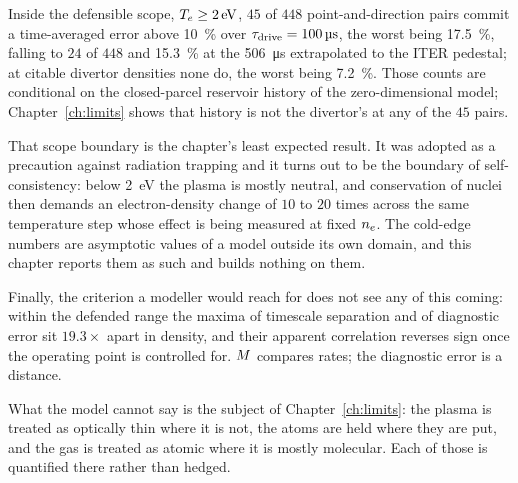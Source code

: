 Inside the defensible scope, $T_e\ge\SI{2}{\electronvolt}$, $45$ of $448$
point-and-direction pairs commit a time-averaged error above \SI{10}{\percent}
over $\tau_{\mathrm{drive}} = \SI{100}{\micro\second}$, the worst being \SI{17.5}{\percent},
falling to $24$ of $448$ and \SI{15.3}{\percent} at the
\SI{506}{\micro\second} extrapolated to the ITER pedestal;
at citable divertor densities none do, the worst being \SI{7.2}{\percent}.
Those counts are conditional on the closed-parcel reservoir history of the
zero-dimensional model; Chapter~\ref{ch:limits} shows that history is not the
divertor's at any of the $45$ pairs.

That scope boundary is the chapter's least expected result. It was adopted as a
precaution against radiation trapping and it turns out to be the boundary of
self-consistency: below \SI{2}{\electronvolt} the plasma is mostly neutral, and
conservation of nuclei then demands an electron-density change of $10$ to $20$
times across the same temperature step whose effect is being measured at fixed
$n_e$. The cold-edge numbers are asymptotic values of a model outside its own
domain, and this chapter reports them as such and builds nothing on them.

Finally, the criterion a modeller would reach for does not see any of this
coming: within the defended range the maxima of timescale separation and of
diagnostic error sit $19.3\times$ apart in density, and their apparent
correlation reverses sign once the operating point is controlled for. $M$
compares rates; the diagnostic error is a distance.

What the model cannot say is the subject of Chapter~\ref{ch:limits}: the plasma
is treated as optically thin where it is not, the atoms are held where they are
put, and the gas is treated as atomic where it is mostly molecular. Each of
those is quantified there rather than hedged.
